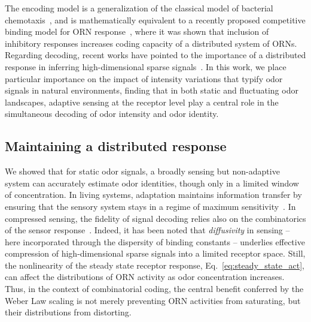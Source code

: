 The encoding model is a generalization of the classical model of bacterial chemotaxis~\cite{tu_shimizu_berg}, and is mathematically equivalent to a recently proposed competitive binding model for ORN response~\cite{Cao_Tu_WL}, where it was shown that inclusion of inhibitory responses increases coding capacity of a distributed system of ORNs. Regarding decoding, recent works have pointed to the importance of a distributed response in inferring high-dimensional sparse signals~\cite{vijay_1, vijay_2, sharpee_zhang}. In this work, we place particular importance on the impact of intensity variations that typify odor signals in natural environments, finding that in both static and fluctuating odor landscapes, adaptive sensing at the receptor level play a central role in the simultaneous decoding of odor intensity and odor identity. 


\subsection{Maintaining a distributed response}

We showed that for static odor signals, a broadly sensing but non-adaptive system can accurately estimate odor identities, though only in a limited window of concentration. In living systems, adaptation maintains information transfer by ensuring that the sensory system stays in a regime of maximum sensitivity~\cite{information_theory_adaptation}. In compressed sensing, the fidelity of signal decoding relies also on the combinatorics of the sensor response~\cite{CS_tao, CS_donoho, CS_ganguli}. Indeed, it has been noted that \textit{diffusivity} in sensing -- here incorporated through the dispersity of binding constants -- underlies effective compression of high-dimensional sparse signals into a limited receptor space. Still, the nonlinearity of the steady state receptor response, Eq.~\ref{eq:steady_state_act}, can affect the distributions of ORN activity as odor concentration increases. Thus, in the context of combinatorial coding, the central benefit conferred by the Weber Law scaling is not merely preventing ORN activities from saturating, but their distributions from distorting. 

